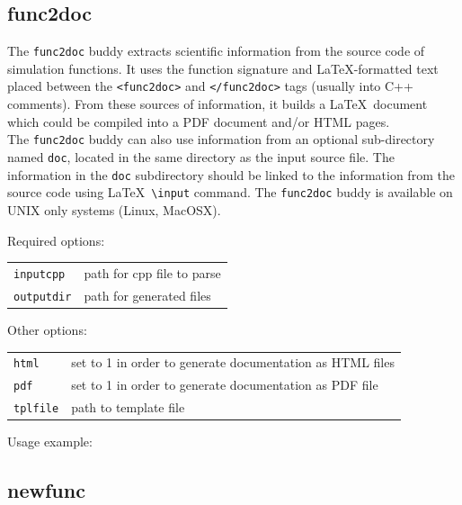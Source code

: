 \subsection{func2doc}

The \texttt{func2doc} buddy extracts scientific information from the source code of simulation functions. It uses the function signature and \LaTeX-formatted text placed between the \texttt{<func2doc>} and \texttt{</func2doc>} tags (usually into C++ comments). From these sources of information, it builds a \LaTeX\ document which could be compiled into a PDF document and/or HTML pages.\\
The \texttt{func2doc} buddy can also use information from an optional sub-directory named \texttt{doc}, located in the same directory as the input source file. The information in the \texttt{doc} subdirectory should be linked to the information from the source code using \LaTeX\ \texttt{\textbackslash input} command.  
The \texttt{func2doc} buddy is available on UNIX only systems (Linux, MacOSX).

\bigskip

\noindent Required options:
\begin{center}
\begin{tabularx}{\linewidth}{lX}
\texttt{inputcpp}&path for cpp file to parse\\
\texttt{outputdir}&path for generated files\\
\end{tabularx}
\end{center}

\noindent Other options:
\begin{center}
\begin{tabularx}{\linewidth}{lX}
\texttt{html}&set to 1 in order to generate documentation as HTML files\\
\texttt{pdf}&set to 1 in order to generate documentation as PDF file\\
\texttt{tplfile}&path to template file\\
\end{tabularx}
\end{center}

\bigskip

\noindent Usage example:\\


\subsection{newfunc}

